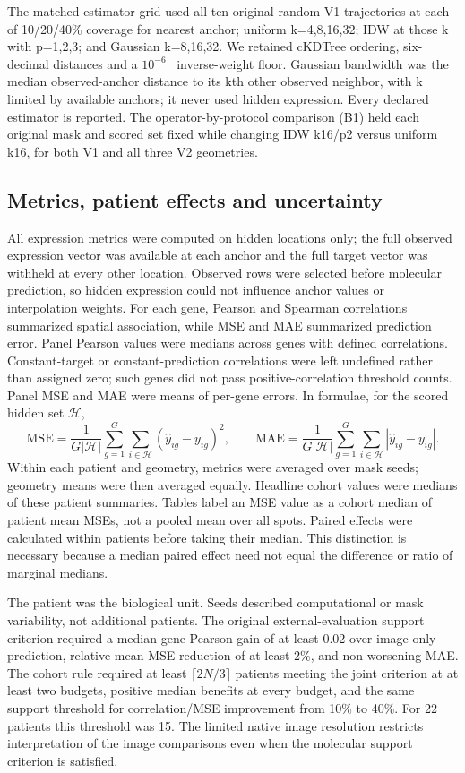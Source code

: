 The matched-estimator grid used all ten original random V1 trajectories at each of 10/20/40\% coverage for nearest anchor; uniform k=4,8,16,32; IDW at those k with p=1,2,3; and Gaussian k=8,16,32. We retained cKDTree ordering, six-decimal distances and a $10^{-6}$~\um{} inverse-weight floor. Gaussian bandwidth was the median observed-anchor distance to its kth other observed neighbor, with k limited by available anchors; it never used hidden expression. Every declared estimator is reported. The operator-by-protocol comparison (B1) held each original mask and scored set fixed while changing IDW k16/p2 versus uniform k16, for both V1 and all three V2 geometries.


\subsection{Metrics, patient effects and uncertainty}
All expression metrics were computed on hidden locations only; the full observed expression vector was available at each anchor and the full target vector was withheld at every other location. Observed rows were selected before molecular prediction, so hidden expression could not influence anchor values or interpolation weights. For each gene, Pearson and Spearman correlations summarized spatial association, while MSE and MAE summarized prediction error. Panel Pearson values were medians across genes with defined correlations. Constant-target or constant-prediction correlations were left undefined rather than assigned zero; such genes did not pass positive-correlation threshold counts. Panel MSE and MAE were means of per-gene errors. In formulae, for the scored hidden set $\mathcal H$,
\begin{equation}
 \mathrm{MSE}=\frac{1}{G|\mathcal H|}\sum_{g=1}^{G}\sum_{i\in\mathcal H}(\widehat y_{ig}-y_{ig})^2,\qquad
 \mathrm{MAE}=\frac{1}{G|\mathcal H|}\sum_{g=1}^{G}\sum_{i\in\mathcal H}|\widehat y_{ig}-y_{ig}|.
 \label{eq:errors}
\end{equation}
Within each patient and geometry, metrics were averaged over mask seeds; geometry means were then averaged equally. Headline cohort values were medians of these patient summaries. Tables label an MSE value as a cohort median of patient mean MSEs, not a pooled mean over all spots. Paired effects were calculated within patients before taking their median. This distinction is necessary because a median paired effect need not equal the difference or ratio of marginal medians.

The patient was the biological unit. Seeds described computational or mask variability, not additional patients.  The original external-evaluation support criterion required a median gene Pearson gain of at least 0.02 over image-only prediction, relative mean MSE reduction of at least 2\%, and non-worsening MAE. The cohort rule required at least $\lceil2N/3\rceil$ patients meeting the joint criterion at at least two budgets, positive median benefits at every budget, and the same support threshold for correlation/MSE improvement from 10\% to 40\%. For 22 patients this threshold was 15. The limited native image resolution restricts interpretation of the image comparisons even when the molecular support criterion is satisfied.

